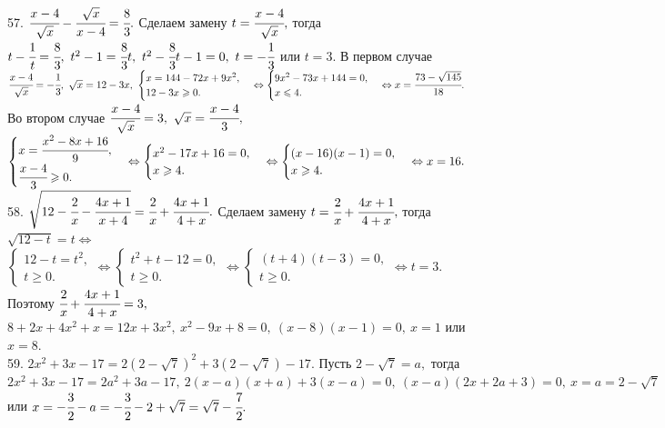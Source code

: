 \documentclass[12pt]{article}
\begin{document}
57. $\cfrac{x-4}{\sqrt{x}}-\cfrac{\sqrt{x}}{x-4}=\cfrac{8}{3}.$ Сделаем замену $t=\cfrac{x-4}{\sqrt{x}},$ тогда $t-\cfrac{1}{t}=\cfrac{8}{3},\ t^2-1=\cfrac{8}{3}t,\
 t^2-\cfrac{8}{3}t-1=0,\ t=-\cfrac{1}{3}$ или $t=3.$ В первом случае $\cfrac{x-4}{\sqrt{x}}=-\cfrac{1}{3},\ \sqrt{x}=12-3x,\ \begin{cases} x=144-72x+9x^2,\\ 12-3x\geqslant0.\end{cases}\Leftrightarrow\begin{cases} 9x^2-73x+144=0,\\ x\leqslant4.\end{cases}\Leftrightarrow x=\cfrac{73-\sqrt{145}}{18}.$ Во втором случае $
\cfrac{x-4}{\sqrt{x}}=3,\ \sqrt{x}=\cfrac{x-4}{3},$\\$ \begin{cases} x=\cfrac{x^2-8x+16}{9},\\ \cfrac{x-4}{3}\geqslant0.\end{cases}\Leftrightarrow
\begin{cases} x^2-17x+16=0,\\ x\geqslant4.\end{cases}\Leftrightarrow\begin{cases} (x-16)(x-1)=0,\\ x\geqslant4.\end{cases}\Leftrightarrow x=16.$\\
58. $\sqrt{12-\cfrac{2}{x}-\cfrac{4x+1}{x+4}}=\cfrac{2}{x}+\cfrac{4x+1}{4+x}.$ Сделаем замену $t=\cfrac{2}{x}+\cfrac{4x+1}{4+x},$ тогда $\sqrt{12-t}=t\Leftrightarrow$\\$ \begin{cases} 12-t=t^2,\\ t\geqslant0.\end{cases}\Leftrightarrow \begin{cases} t^2+t-12=0,\\ t\geqslant0.\end{cases}
\Leftrightarrow \begin{cases} (t+4)(t-3)=0,\\ t\geqslant0.\end{cases}\Leftrightarrow t=3.$ Поэтому $\cfrac{2}{x}+\cfrac{4x+1}{4+x}=3,$\\$
8+2x+4x^2+x=12x+3x^2,\ x^2-9x+8=0,\ (x-8)(x-1)=0,\ x=1$ или $x=8.$\\
59. $2x^2+3x-17=2(2-\sqrt{7})^2+3(2-\sqrt{7})-17.$ Пусть $2-\sqrt{7}=a,$ тогда $2x^2+3x-17=2a^2+3a-17,\ 2(x-a)(x+a)+3(x-a)=0,\ (x-a)(2x+2a+3)=0,\ x=a=2-\sqrt{7}$ или $x=-\cfrac{3}{2}-a=-\cfrac{3}{2}-2+\sqrt{7}=\sqrt{7}-\cfrac{7}{2}.$\\
\end{document}
